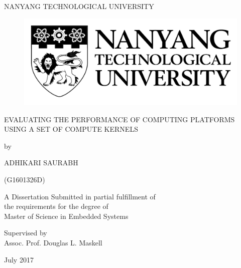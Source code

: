 \begin{titlepage}
\begin{center}
{\LARGE {NANYANG TECHNOLOGICAL UNIVERSITY}}
\begin{figure}[!t]
\centering
\includegraphics[width= 8 cm]{images/NTU_logo.pdf}
\end{figure} 
\vspace*{0.7in}
{\large EVALUATING THE PERFORMANCE OF COMPUTING PLATFORMS USING A SET OF COMPUTE KERNELS}
\par
\vspace{0.4 in}
{\large by\\}
\vspace{0.2 in}
{\large ADHIKARI SAURABH

(G1601326D)}
\vspace{0.1 in}
\par
\vfill
A Dissertation Submitted in partial fulfillment of \\ the requirements for the degree of \\ Master of Science in Embedded Systems
\par
\vspace{0.4in}
Supervised by\\
\vspace{0.1in}
{\large Assoc. Prof. Douglas L. Maskell \\}
\par
\vspace{0.15in}
July 2017
\end{center}
\end{titlepage}